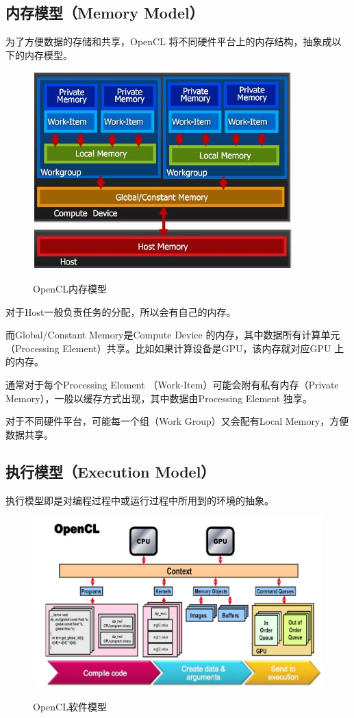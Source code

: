 \documentclass{ctexart}
\begin{document}
\subsection{内存模型（Memory Model）}
为了方便数据的存储和共享，OpenCL 将不同硬件平台上的内存结构，抽象成以下的内存模型。
\begin{figure}[!ht]
  \centering
  \includegraphics[width=0.6\linewidth]{neicunmoxing.jpg}\\
  \caption{OpenCL内存模型}
\end{figure}
对于Host一般负责任务的分配，所以会有自己的内存。

而Global/Constant Memory是Compute Device 的内存，其中数据所有计算单元（Processing Element）共享。比如如果计算设备是GPU，该内存就对应GPU 上的内存。

通常对于每个Processing Element （Work-Item）可能会附有私有内存（Private Memory），一般以缓存方式出现，其中数据由Processing Element 独享。

对于不同硬件平台，可能每一个组（Work Group）又会配有Local Memory，方便数据共享。

\subsection{执行模型（Execution Model）}
执行模型即是对编程过程中或运行过程中所用到的环境的抽象。
\begin{figure}[!ht]
  \centering
  \includegraphics[width=0.7\linewidth]{ruanjianmoxing.jpg}\\
  \caption{OpenCL软件模型}
\end{figure}
\end{document}
